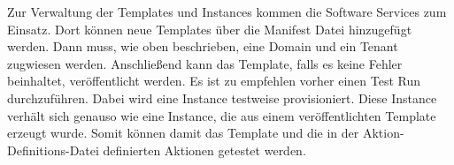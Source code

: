 Zur Verwaltung der Templates und Instances kommen die \glqq Software Services\grqq{} zum Einsatz.
Dort können neue Templates über die \glqq Manifest Datei\grqq{} hinzugefügt werden.
Dann muss, wie oben beschrieben, eine \glqq Domain\grqq{} und ein \glqq Tenant\grqq{} zugwiesen werden.
Anschließend kann das Template, falls es keine Fehler beinhaltet, veröffentlicht werden.
Es ist zu empfehlen vorher einen \glqq Test Run\grqq{} durchzuführen.
Dabei wird eine Instance testweise provisioniert.
Diese Instance verhält sich genauso wie eine Instance, die aus einem veröffentlichten Template erzeugt wurde.
Somit können damit das Template und die in der Aktion-Definitions-Datei definierten Aktionen getestet werden.
\cite{Rotthove.2018}
